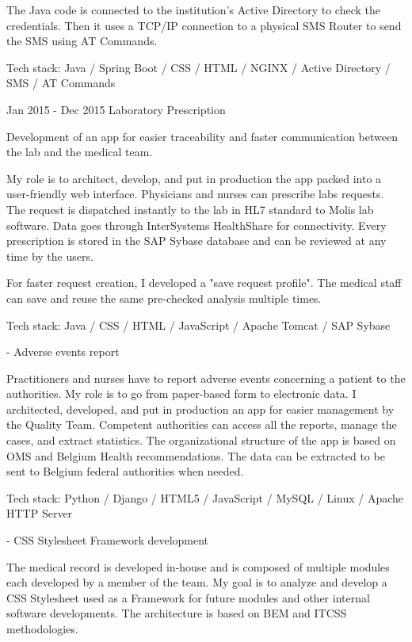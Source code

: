 \begin{cventries}
{The Java code is connected to the institution's Active Directory to check the credentials. Then it uses a TCP/IP connection to a physical SMS Router to send the SMS using AT Commands.

Tech stack: Java / Spring Boot / CSS / HTML / NGINX / Active Directory / SMS / AT Commands

    }
    
    
    
    
  \cventry
    {Jan 2015 - Dec 2015} %
    {Laboratory Prescription} %
    {} %
    {} %
    {
Development of an app for easier traceability and faster communication between the lab and the medical team.

My role is to architect, develop, and put in production the app packed into a user-friendly web interface. 
Physicians and nurses can prescribe labs requests. The request is dispatched instantly to the lab in HL7 standard to Molis lab software. Data goes through InterSystems HealthShare for connectivity. 
Every prescription is stored in the SAP Sybase database and can be reviewed at any time by the users.

For faster request creation, I developed a "save request profile". The medical staff can save and reuse the same pre-checked analysis multiple times.

Tech stack: Java / CSS / HTML / JavaScript / Apache Tomcat / SAP Sybase

    }
    
    
    
    
  \cventry
    {-} %
    {Adverse events report} %
    {} %
    {} %
    {
Practitioners and nurses have to report adverse events concerning a patient to the authorities.
My role is to go from paper-based form to electronic data.
I architected, developed, and put in production an app for easier management by the Quality Team.
Competent authorities can access all the reports, manage the cases, and extract statistics.
The organizational structure of the app is based on OMS and Belgium Health recommendations.
The data can be extracted to be sent to Belgium federal authorities when needed.

Tech stack: Python / Django / HTML5 / JavaScript / MySQL / Linux / Apache HTTP Server

    }
    
    
  \cventry
    {-} %
    {CSS Stylesheet Framework development} %
    {} %
    {} %
    {
The medical record is developed in-house and is composed of multiple modules each developed by a member of the team.
My goal is to analyze and develop a CSS Stylesheet used as a Framework for future modules and other internal software developments.
The architecture is based on BEM and ITCSS methodologies. 

}
\end{cventries}
